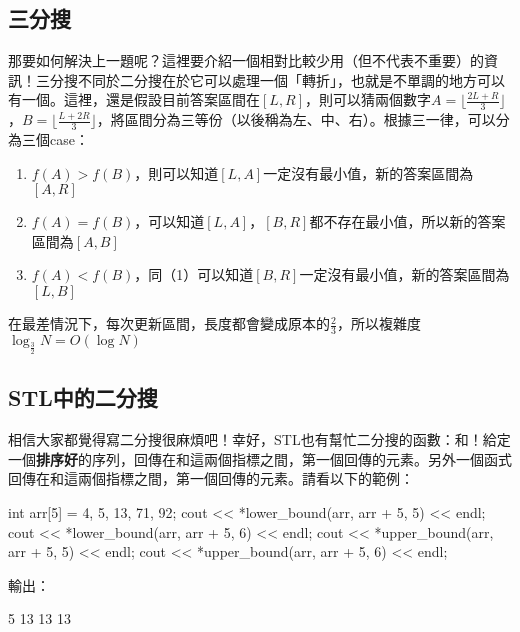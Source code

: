 	\subsection{三分搜}
		那要如何解決上一題呢？這裡要介紹一個相對比較少用（但不代表不重要）的資訊！三分搜不同於二分搜在於它可以處理一個「轉折」，也就是不單調的地方可以有一個。這裡，還是假設目前答案區間在$[L, R]$，則可以猜兩個數字$A = \lfloor \frac{2L + R}{3} \rfloor$，$B = \lfloor \frac{L + 2R}{3} \rfloor$，將區間分為三等份（以後稱為左、中、右）。根據三一律，可以分為三個case：
		\begin{enumerate}
			\item $f(A) > f(B)$，則可以知道$[L, A]$一定沒有最小值，新的答案區間為$[A, R]$
			\item $f(A) = f(B)$，可以知道$[L, A]$，$[B, R]$都不存在最小值，所以新的答案區間為$[A, B]$
			\item $f(A) < f(B)$，同（1）可以知道$[B, R]$一定沒有最小值，新的答案區間為$[L, B]$
		\end{enumerate}
		在最差情況下，每次更新區間，長度都會變成原本的$\frac{2}{3}$，所以複雜度$\log_{\frac{3}{2}}N = O(\log N)$
	\subsection{STL中的二分搜}
		相信大家都覺得寫二分搜很麻煩吧！幸好，STL也有幫忙二分搜的函數：和！給定一個\textbf{排序好}的序列，回傳在和這兩個指標之間，第一個回傳的元素。另外一個函式回傳在和這兩個指標之間，第一個回傳的元素。請看以下的範例：
		\begin{C++}
int arr[5] = {4, 5, 13, 71, 92};
cout << *lower_bound(arr, arr + 5, 5) << endl;
cout << *lower_bound(arr, arr + 5, 6) << endl;
cout << *upper_bound(arr, arr + 5, 5) << endl;
cout << *upper_bound(arr, arr + 5, 6) << endl;
		\end{C++}
	輸出：
	\begin{C++}
5
13
13
13
	\end{C++}
